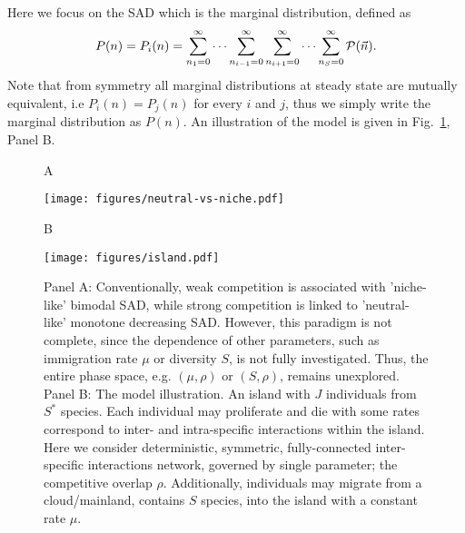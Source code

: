 \documentclass[9pt,lineno]{elife}
\begin{document}
Here we focus on the SAD which is the marginal distribution, defined as
\begin{equation}
  P(n)= P_i(n)=\sum_{n_1=0}^{\infty}\cdots \sum_{n_{i-1}=0}^{\infty}\sum_{n_{i+1}=0}^{\infty}\cdots \sum_{n_S=0}^{\infty}{\rm \mathcal{P}}(\vec{n}).
\end{equation}
Note that from symmetry all marginal distributions at steady state are mutually equivalent, i.e  $P_i(n)=P_j(n)$ for every $i$ and $j$, thus we simply write the marginal distribution as $P(n)$. An illustration of the model is given in Fig.~\ref{fig:fig1}, Panel B.

\iffalse
The master equation for this marginal distribution is one dimensional with rates

\begin{eqnarray}
q^+(n)&=&r^+ n +\mu,  \\
q^-(n)&=&r^- n + \frac{r}{K} n \left((1-\rho)n + \rho \langle J | n_i = n \rangle \right). \nonumber
\end{eqnarray}
\fi

\begin{figure}
   \begin{flushleft}
        A
   \end{flushleft}
    \texttt{[image: figures/neutral-vs-niche.pdf]}
    \begin{flushleft}
        B
   \end{flushleft}
    \texttt{[image: figures/island.pdf]}
    \caption{Panel A: Conventionally, weak competition is associated with 'niche-like' bimodal SAD, while strong competition is linked to 'neutral-like' monotone decreasing SAD. However, this paradigm is not complete, since the dependence of other parameters, such as immigration rate $\mu$ or diversity $S$, is not fully investigated. Thus, the entire phase space, e.g. $(\mu, \rho)$ or $(S, \rho)$,  remains unexplored. Panel B: The model illustration. An island with $J$ individuals from $S^*$ species.  Each individual may proliferate and die with some rates correspond to inter- and intra-specific interactions within the island. Here we consider deterministic, symmetric, fully-connected inter-specific interactions network, governed by single parameter; the competitive overlap $\rho$. Additionally, individuals may migrate from a cloud/mainland, contains $S$ species, into the island with a constant rate $\mu$.       }
    \label{fig:fig1}
\end{figure}
\end{document}
